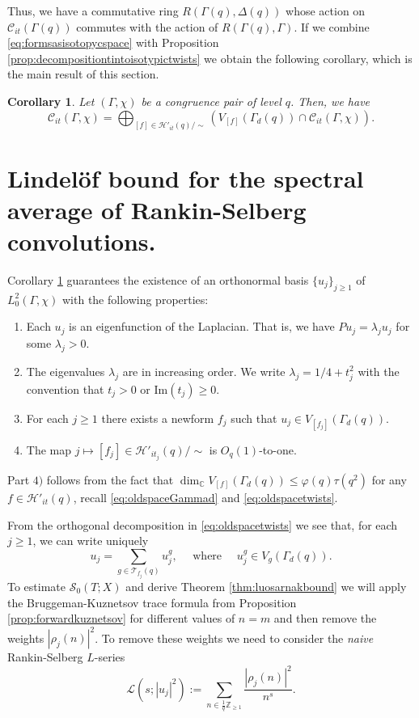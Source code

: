 \documentclass{article}
\newtheorem{cor}[thm]{Corollary}
\theoremstyle{named}
\newcommand{\C}{\mathcal{C}}
\newcommand{\HH}{\mathcal{H}}
\newcommand{\Z}{\mathbb{Z}}
\renewcommand{\L}{\mathcal{L}}
\renewcommand{\S}{\mathcal{S}}
\newcommand{\CC}{\mathbb{C}}
\newcommand{\T}{\mathcal{T}}
\begin{document}
Thus, we have a commutative ring $R(\Gamma(q), \Delta(q))$ whose action on $\C_{it}(\Gamma(q))$ commutes with the action of $R(\Gamma(q), \Gamma)$. If we combine \eqref{eq:formsasisotopycspace} with Proposition \ref{prop:decompositiontintoisotypictwists} we obtain the following corollary, which is the main result of this section. 
\begin{cor}\label{cor:basisaslinearcombinationoftwists}
Let $(\Gamma, \chi)$ be a congruence pair of level $q$. Then, we have
\begin{equation*}
    \C_{it}(\Gamma, \chi) = \bigoplus_{[f] \in \HH'_{it}(q)/\sim}\left(V_{[f]}(\Gamma_d(q)) \cap \C_{it}(\Gamma, \chi)\right).
\end{equation*}   
\end{cor}


\section{Lindelöf bound for the spectral average of Rankin-Selberg convolutions.}\label{sec:rankinselbergandadjointlfunction}
Corollary \ref{cor:basisaslinearcombinationoftwists} guarantees the existence of an orthonormal basis $\{u_j\}_{j \geq 1}$ of $L_0^2(\Gamma, \chi)$ with the following properties:
\begin{enumerate}
    \item [1)] Each $u_j$ is an eigenfunction of the Laplacian. That is, we have $P u_j = \lambda_j u_j$ for some $\lambda_j > 0$. 
    \item [2)] The eigenvalues $\lambda_j$ are in increasing order. We write $\lambda_j = 1/4 + t_j^2$ with the convention that $t_j > 0$ or $\text{Im}(t_j) \geq 0$.    
    \item [3)] For each $j \geq 1$ there exists a newform $f_j$ such that $u_j \in V_{[f_j]}(\Gamma_d(q))$.
    \item [4)] The map $j \mapsto [f_j] \in \HH'_{it_j}(q)/\sim$ is $O_q(1)$-to-one.
\end{enumerate}
Part $4)$ follows from the fact that $\dim_\CC V_{[f]}(\Gamma_d(q)) \leq \varphi(q)\tau(q^2)$ for any $f \in \HH'_{it}(q)$, recall \eqref{eq:oldspaceGammad} and \eqref{eq:oldspacetwists}.

From the orthogonal decomposition in \eqref{eq:oldspacetwists} we see that, for each $j \geq 1$, we can write uniquely
\begin{equation}\label{eq:decompositionmaassformintocomponents}
    u_j = \sum_{g \in \T_{f_j}(q)} u_j^g, \quad  \text{ where }\quad u_j^g \in V_g(\Gamma_d(q)).
\end{equation} 
To estimate $\S_0(T;X)$ and derive Theorem \ref{thm:luosarnakbound} we will apply the Bruggeman-Kuznetsov trace formula from Proposition \ref{prop:forwardkuznetsov} for different values of $n = m$ and then remove the weights $|\rho_j(n)|^2$. To remove these weights we need to consider the \emph{naive} Rankin-Selberg $L$-series
\begin{equation}\label{eq:naiverankinselberg}
    \L(s; |u_j|^2) := \sum_{n \in \frac{1}{q}\Z_{\geq 1}} \frac{|\rho_j(n)|^2}{n^s}.
\end{equation}
\end{document}
